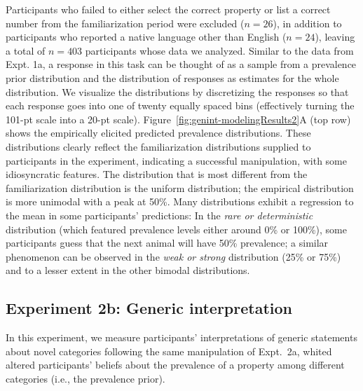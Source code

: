 \documentclass[floatsintext,doc]{apa6}
\begin{document}
Participants who failed to either select the correct property or list a correct number from the familiarization period were excluded ($n=26$), in addition to participants who reported a native language other than English ($n=24$), leaving a total of $n=403$ participants whose data we analyzed.
Similar to the data from Expt. 1a, a response in this task can be thought of as a sample from a prevalence prior distribution and the distribution of responses as estimates for the whole distribution.
We visualize the distributions by discretizing the responses so that each response goes into one of twenty equally spaced bins (effectively turning the 101-pt scale into a 20-pt scale).
Figure~\ref{fig:genint-modelingResults2}A (top row) shows the empirically elicited predicted prevalence distributions.
These distributions clearly reflect the familiarization distributions supplied to participants in the experiment, indicating a successful manipulation, with some idiosyncratic features.
The distribution that is most different from the familiarization distribution is the uniform distribution; the empirical distribution is more unimodal with a peak at 50\%.
Many distributions exhibit a regression to the mean in some participants' predictions: In the \emph{rare or deterministic} distribution (which featured prevalence levels either around 0\% or 100\%), some participants guess that the next animal will have 50\% prevalence; a similar phenomenon can be observed in the \emph{weak or strong} distribution (25\% or 75\%) and to a lesser extent in the other bimodal distributions.



\hypertarget{experiment-2b-generic-interpretation}{%
\subsection{Experiment 2b: Generic interpretation}\label{experiment-2b-generic-interpretation}}

In this experiment, we measure participants' interpretations of generic statements about novel categories following the same manipulation of Expt.~2a, whited altered participants' beliefs about the prevalence of a property among different categories (i.e., the prevalence prior). 
\end{document}
